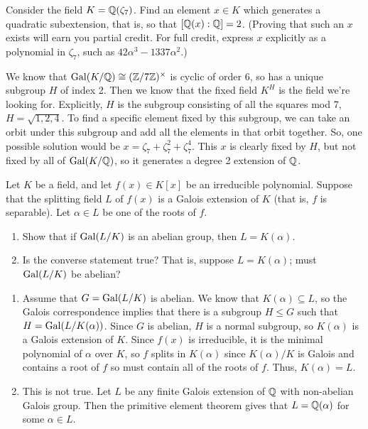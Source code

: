 %
\begin{question}[subtitle={August 2016 Problem 5, modified},ID=Aug16_5]
Consider the field $K = \mathbb{Q}(\zeta_7)$. Find an element $x \in K$ which generates a quadratic subextension, that is, so that $[\mathbb{Q}(x):\mathbb{Q}] = 2$. (Proving that such an $x$ exists will earn you partial credit. For full credit, express $x$ explicitly as a polynomial in $\zeta_7$, such as $42\alpha^3-1337\alpha^2$.)
\end{question}
\begin{question}
We know that $\operatorname{Gal}(K/\mathbb{Q}) \cong (\mathbb{Z}/7\mathbb{Z})^{\times}$ is cyclic of order 6, so has a unique subgroup $H$ of index 2. Then we know that the fixed field $K^H$ is the field we're looking for. Explicitly, $H$ is the subgroup consisting of all the squares mod 7, $H = \sqrt{1,2,4}$. To find a specific element fixed by this subgroup, we can take an orbit under this subgroup and add all the elements in that orbit together. So, one possible solution would be $x = \zeta_7 + \zeta_7^2 + \zeta_7^4$. This $x$ is clearly fixed by $H$, but not fixed by all of $\operatorname{Gal}(K/\mathbb{Q})$, so it generates a degree 2 extension of $\mathbb{Q}$.
\end{question}

\begin{question}[subtitle=January 2016 Problem 1,ID=Jan16_1]
Let $K$ be a field, and let $f(x) \in K[x]$ be an irreducible polynomial. Suppose that the splitting field $L$ of $f(x)$ is a Galois extension of $K$ (that is, $f$ is separable). Let $\alpha \in L$ be one of the roots of $f$.
\begin{enumerate}
    \item Show that if $\operatorname{Gal}(L/K)$ is an abelian group, then $L=K(\alpha)$.
    \item Is the converse statement true? That is, suppose $L=K(\alpha)$; must $\operatorname{Gal}(L/K)$ be abelian?
\end{enumerate}
\end{question}
\begin{solution}
\begin{enumerate}
    \item Assume that $G=\operatorname{Gal}(L/K)$ is abelian. We know that $K(\alpha) \subseteq L$, so the Galois correspondence implies that there is a subgroup $H \leq G$ such that $H=\operatorname{Gal}(L/K(\alpha))$. Since $G$ is abelian, $H$ is a normal subgroup, so $K(\alpha)$ is a Galois extension of $K$. Since $f(x)$ is irreducible, it is the minimal polynomial of $\alpha$ over $K$, so $f$ splits in $K(\alpha)$ since $K(\alpha)/K$ is Galois and contains a root of $f$ so must contain all of the roots of $f$. Thus, $K(\alpha)=L$.
    \item This is not true. Let $L$ be any finite Galois extension of $\mathbb{Q}$ with non-abelian Galois group. Then the primitive element theorem gives that $L=\mathbb{Q}(\alpha)$ for some $\alpha \in L$.
\end{enumerate}
\end{solution}

